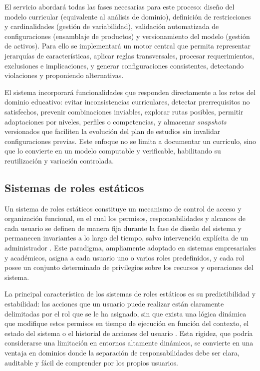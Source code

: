 El servicio abordará todas las fases necesarias para este proceso: 
diseño del modelo curricular (equivalente al análisis de dominio),
definición de restricciones y cardinalidades (gestión de variabilidad), validación 
automatizada de configuraciones (ensamblaje de productos) y
versionamiento del modelo (gestión de activos). Para ello se implementará 
un motor central que permita representar jerarquías de características, 
aplicar reglas transversales, procesar requerimientos, exclusiones
e implicaciones, y generar configuraciones consistentes, detectando violaciones 
y proponiendo alternativas.

El sistema incorporará funcionalidades que responden directamente
a los retos del dominio educativo: evitar inconsistencias curriculares, detectar 
prerrequisitos no satisfechos, prevenir combinaciones inviables,
explorar rutas posibles, permitir adaptaciones por niveles, perfiles o competencias, 
y almacenar \textit{snapshots} versionados que faciliten la evolución
del plan de estudios sin invalidar configuraciones previas. Este enfoque
no se limita a documentar un currículo, sino que lo convierte en un modelo 
computable y verificable, habilitando su reutilización y variación controlada.

\subsection{Sistemas de roles estáticos}

Un sistema de roles estáticos constituye un mecanismo de control de acceso y organización funcional, en el 
cual los permisos, responsabilidades y alcances de cada usuario se definen de manera fija durante la fase de 
diseño del sistema y permanecen invariantes a lo largo del tiempo, salvo intervención explícita de un 
administrador \citep{ferraiolo2007role, sandhu1996role}. Este paradigma, ampliamente adoptado en sistemas 
empresariales y académicos, asigna a cada usuario uno o varios roles predefinidos, y cada rol posee un 
conjunto determinado de privilegios sobre los recursos y operaciones del sistema.

La principal característica de los sistemas de roles estáticos es su predictibilidad y estabilidad: 
las acciones que un usuario puede realizar están claramente delimitadas por el rol que se le ha asignado, 
sin que exista una lógica dinámica que modifique estos permisos en tiempo de ejecución en función del contexto, 
el estado del sistema o el historial de acciones del usuario \citep{hu2006assessment}. Esta rigidez, que 
podría considerarse una limitación en entornos altamente dinámicos, se convierte en una ventaja en dominios 
donde la separación de responsabilidades debe ser clara, auditable y fácil de comprender por los propios 
usuarios.

